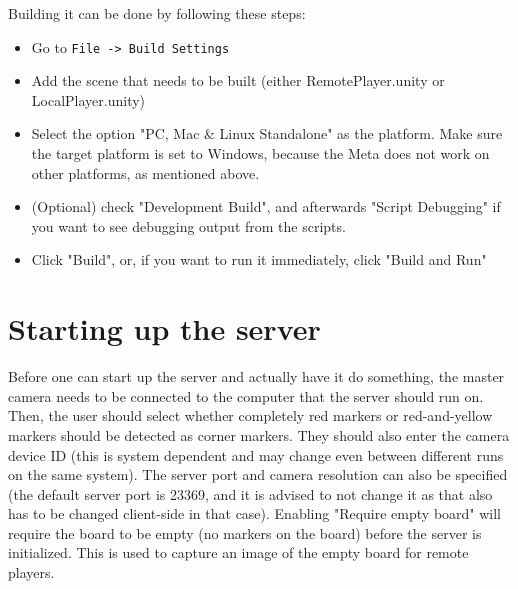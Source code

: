 \documentclass{report}
\begin{document}
	Building it can be done by following these steps:
	
	\begin{itemize}
		\item Go to \verb#File -> Build Settings#
		\item Add the scene that needs to be built (either RemotePlayer.unity or LocalPlayer.unity)
		\item Select the option "PC, Mac \& Linux Standalone" as the platform. Make sure the 
		      target platform is set to Windows, because the Meta does not work on other platforms,
		      as mentioned above.
		\item (Optional) check "Development Build", and afterwards "Script Debugging" if you
			  want to see debugging output from the scripts.
		\item Click "Build", or, if you want to run it immediately, click "Build and Run"
	\end{itemize}

\section*{Starting up the server}
	Before one can start up the server and actually have it do something, the master
	camera needs to be connected to the computer that the server should run on. 
	Then, the user should select whether completely red markers or red-and-yellow
	markers should be detected as corner markers. They should also enter the camera
	device ID (this is system dependent and may change even between different runs on the 
	same system). The server port and camera resolution can also be specified (the default 
	server port is 23369, and it is advised to not change it as that also has to be changed
	client-side in that case). Enabling "Require empty board" will require the board
	to be empty (no markers on the board) before the server is initialized. This is
	used to capture an image of the empty board for remote players.
	
\end{document}
